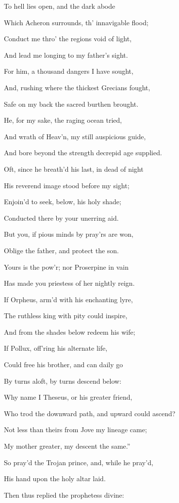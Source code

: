 To hell lies open, and the dark abode

Which Acheron surrounds, th’ innavigable flood;

Conduct me thro’ the regions void of light,

And lead me longing to my father’s sight.

For him, a thousand dangers I have sought,

And, rushing where the thickest Grecians fought,

Safe on my back the sacred burthen brought.

He, for my sake, the raging ocean tried,

And wrath of Heav’n, my still auspicious guide,

And bore beyond the strength decrepid age supplied.

Oft, since he breath’d his last, in dead of night

His reverend image stood before my sight;

Enjoin’d to seek, below, his holy shade;

Conducted there by your unerring aid.

But you, if pious minds by pray’rs are won,

Oblige the father, and protect the son.

Yours is the pow’r; nor Proserpine in vain

Has made you priestess of her nightly reign.

If Orpheus, arm’d with his enchanting lyre,

The ruthless king with pity could inspire,

And from the shades below redeem his wife;

If Pollux, off’ring his alternate life,

Could free his brother, and can daily go

By turns aloft, by turns descend below:

Why name I Theseus, or his greater friend,

Who trod the downward path, and upward could ascend?

Not less than theirs from Jove my lineage came;

My mother greater, my descent the same.”

So pray’d the Trojan prince, and, while he pray’d,

His hand upon the holy altar laid.

Then thus replied the prophetess divine:

